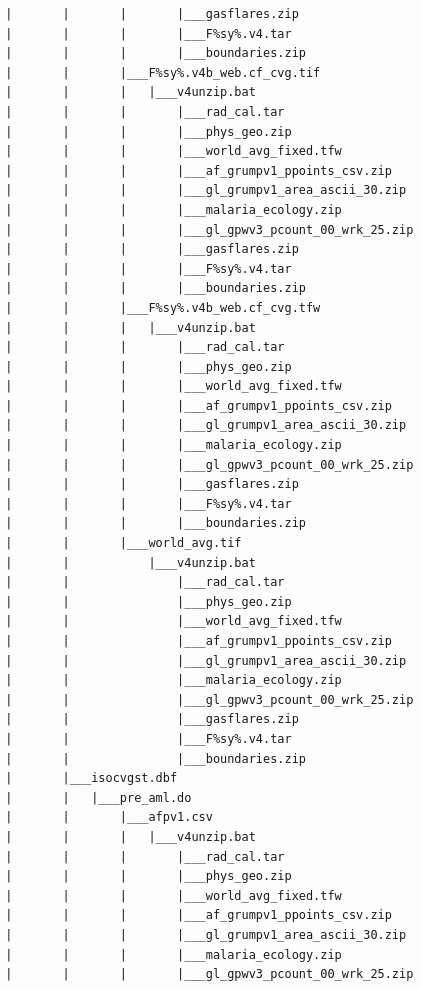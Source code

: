 \documentclass[]{book}
\begin{document}
\begin{verbatim}
        |       |       |       |___gasflares.zip
        |       |       |       |___F%sy%.v4.tar
        |       |       |       |___boundaries.zip
        |       |       |___F%sy%.v4b_web.cf_cvg.tif
        |       |       |   |___v4unzip.bat
        |       |       |       |___rad_cal.tar
        |       |       |       |___phys_geo.zip
        |       |       |       |___world_avg_fixed.tfw
        |       |       |       |___af_grumpv1_ppoints_csv.zip
        |       |       |       |___gl_grumpv1_area_ascii_30.zip
        |       |       |       |___malaria_ecology.zip
        |       |       |       |___gl_gpwv3_pcount_00_wrk_25.zip
        |       |       |       |___gasflares.zip
        |       |       |       |___F%sy%.v4.tar
        |       |       |       |___boundaries.zip
        |       |       |___F%sy%.v4b_web.cf_cvg.tfw
        |       |       |   |___v4unzip.bat
        |       |       |       |___rad_cal.tar
        |       |       |       |___phys_geo.zip
        |       |       |       |___world_avg_fixed.tfw
        |       |       |       |___af_grumpv1_ppoints_csv.zip
        |       |       |       |___gl_grumpv1_area_ascii_30.zip
        |       |       |       |___malaria_ecology.zip
        |       |       |       |___gl_gpwv3_pcount_00_wrk_25.zip
        |       |       |       |___gasflares.zip
        |       |       |       |___F%sy%.v4.tar
        |       |       |       |___boundaries.zip
        |       |       |___world_avg.tif
        |       |           |___v4unzip.bat
        |       |               |___rad_cal.tar
        |       |               |___phys_geo.zip
        |       |               |___world_avg_fixed.tfw
        |       |               |___af_grumpv1_ppoints_csv.zip
        |       |               |___gl_grumpv1_area_ascii_30.zip
        |       |               |___malaria_ecology.zip
        |       |               |___gl_gpwv3_pcount_00_wrk_25.zip
        |       |               |___gasflares.zip
        |       |               |___F%sy%.v4.tar
        |       |               |___boundaries.zip
        |       |___isocvgst.dbf
        |       |   |___pre_aml.do
        |       |       |___afpv1.csv
        |       |       |   |___v4unzip.bat
        |       |       |       |___rad_cal.tar
        |       |       |       |___phys_geo.zip
        |       |       |       |___world_avg_fixed.tfw
        |       |       |       |___af_grumpv1_ppoints_csv.zip
        |       |       |       |___gl_grumpv1_area_ascii_30.zip
        |       |       |       |___malaria_ecology.zip
        |       |       |       |___gl_gpwv3_pcount_00_wrk_25.zip

\end{verbatim}
\end{document}
